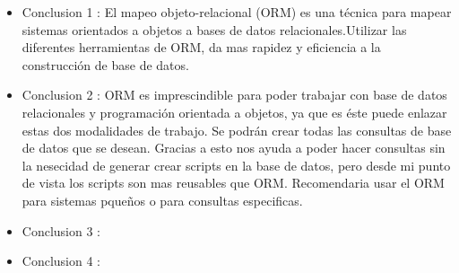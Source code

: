 \documentclass[preprint,12pt]{elsarticle}
\begin{document}
\begin{itemize}

\item Conclusion 1 :  El mapeo objeto-relacional (ORM) es una técnica para mapear sistemas orientados a objetos a bases
de datos relacionales.Utilizar las diferentes herramientas de ORM, da mas rapidez y eficiencia a la construcción de base
de datos.\\

\item Conclusion 2 : ORM es imprescindible para poder trabajar con base de datos relacionales y
programación orientada a objetos, ya que es éste puede enlazar estas dos modalidades
de trabajo. Se podrán crear todas las consultas de base de datos que se desean. Gracias a esto nos ayuda a poder hacer consultas
sin la nesecidad de generar crear scripts en la base de datos, pero desde mi punto de vista los scripts son mas reusables que ORM.
Recomendaria usar el ORM para sistemas pqueños o para consultas especificas.
 

\item Conclusion 3 : \\ 

\item Conclusion 4 : \\ 
\end{itemize}


	
	\newpage
	
		 
	
	
\end{document}
